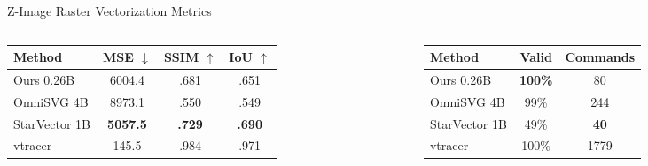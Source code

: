 \documentclass[
  aspectratio=169,
]{beamer}
\newcommand{\metricbest}[1]{\textbf{#1}}
\begin{document}
\begin{frame}{Z-Image Raster Vectorization Metrics}
\small
\begin{columns}[T,onlytextwidth]
  \begin{column}{.52\textwidth}

    \vspace{.3em}
    \begin{tabular}{lccc}
      \toprule
      Method & MSE $\downarrow$ & SSIM $\uparrow$ & IoU $\uparrow$ \\
      \midrule
      Ours 0.26B & 6004.4 & .681 & .651 \\
      OmniSVG 4B & 8973.1 & .550 & .549 \\
      StarVector 1B & \metricbest{5057.5} & \metricbest{.729} & \metricbest{.690} \\
      \midrule
      vtracer & 145.5 & .984 & .971 \\
      \bottomrule
    \end{tabular}
  \end{column}
  \begin{column}{.43\textwidth}

    \vspace{.3em}
    \begin{tabular}{lcc}
      \toprule
      Method & Valid & Commands \\
      \midrule
      Ours 0.26B & \metricbest{100\%} & 80 \\
      OmniSVG 4B & 99\% & 244 \\
      StarVector 1B & 49\% & \metricbest{40} \\
      \midrule
      vtracer & 100\% & 1779 \\
      \bottomrule
    \end{tabular}
  \end{column}
\end{columns}
\end{frame}
\end{document}
